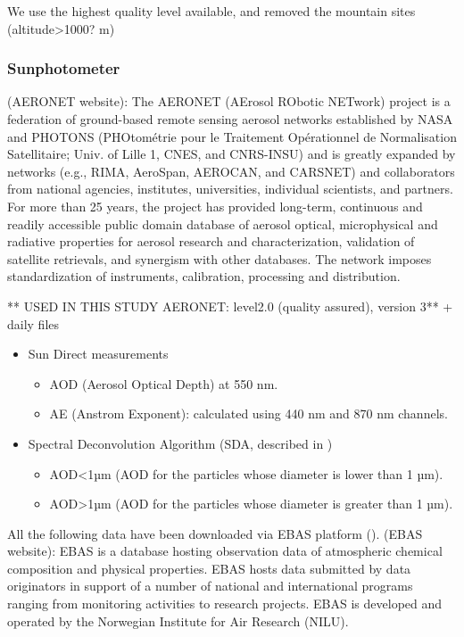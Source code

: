 \documentclass[journal abbreviation, manuscript]{copernicus}
\begin{document}
We use the highest quality level available, and removed the mountain sites (altitude>1000? m)

\subsubsection{Sunphotometer}
(AERONET website): The AERONET (AErosol RObotic NETwork) project is a federation of ground-based remote sensing aerosol networks established by NASA and PHOTONS (PHOtométrie pour le Traitement Opérationnel de Normalisation Satellitaire; Univ. of Lille 1, CNES, and CNRS-INSU) and is greatly expanded by networks (e.g., RIMA, AeroSpan, AEROCAN, and CARSNET) and collaborators from national agencies, institutes, universities, individual scientists, and partners. For more than 25 years, the project has provided long-term, continuous and readily accessible public domain database of aerosol optical, microphysical and radiative properties for aerosol research and characterization, validation of satellite retrievals, and synergism with other databases. The network imposes standardization of instruments, calibration, processing and distribution.


** USED IN THIS STUDY AERONET: level2.0 (quality assured), version 3** + daily files

\begin{itemize}
 \item Sun Direct measurements
       \begin{itemize}
        \item AOD (Aerosol Optical Depth) at 550 nm.
        \item AE (Anstrom Exponent): calculated using 440 nm and 870 nm channels.
       \end{itemize}
 \item Spectral Deconvolution Algorithm (SDA, described in \cite{o2003spectral})
       \begin{itemize}
        \item AOD<1µm (AOD for the particles whose diameter is lower than 1 µm).
        \item AOD>1µm (AOD for the particles whose diameter is greater than 1 µm).
       \end{itemize}
\end{itemize}


All the following data have been downloaded via EBAS platform (\cite{ebasweb}).
(EBAS website): EBAS is a database hosting observation data of atmospheric chemical composition and physical properties. EBAS hosts data submitted by data originators in support of a number of national and international programs ranging from monitoring activities to research projects. EBAS is developed and operated by the Norwegian Institute for Air Research (NILU).
\end{document}
